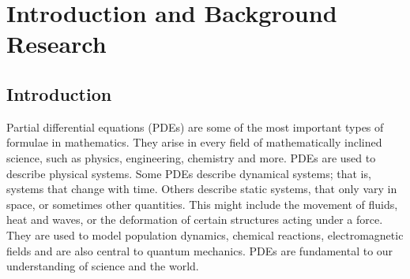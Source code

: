 \chapter{Introduction and Background Research}

\label{chapter1}

\section{Introduction}



Partial differential equations (PDEs) are some of the most important types of formulae in mathematics. They arise in every field of mathematically inclined science, such as physics, engineering, chemistry and more. PDEs are used to describe physical systems. Some PDEs describe dynamical systems; that is, systems that change with time. Others describe static systems, that only vary in space, or sometimes other quantities. This might include the movement of fluids, heat and waves, or the deformation of certain structures acting under a force. They are used to model population dynamics, chemical reactions, electromagnetic fields and are also central to quantum mechanics. PDEs are fundamental to our understanding of science and the world\cite{pde-introduction}.

